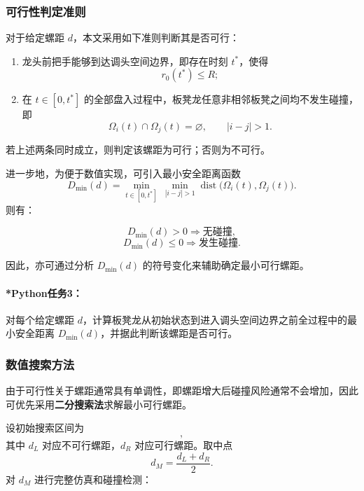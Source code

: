 \documentclass[12pt,a4paper]{ctexart}
\begin{document}
\subsubsection{可行性判定准则}
对于给定螺距 $d$，本文采用如下准则判断其是否可行：

\begin{enumerate}
    \item 龙头前把手能够到达调头空间边界，即存在时刻 $t^\ast$，使得
    \begin{equation}
    r_0(t^\ast)\le R;
    \end{equation}
    \item 在 $t\in[0,t^\ast]$ 的全部盘入过程中，板凳龙任意非相邻板凳之间均不发生碰撞，即
    \begin{equation}
    \Omega_i(t)\cap\Omega_j(t)=\varnothing,\qquad |i-j|>1.
    \end{equation}
\end{enumerate}

若上述两条同时成立，则判定该螺距为可行；否则为不可行。

进一步地，为便于数值实现，可引入最小安全距离函数
\begin{equation}
D_{\min}(d)=\min_{t\in[0,t^\ast]}\ \min_{|i-j|>1}\operatorname{dist}\bigl(\Omega_i(t),\Omega_j(t)\bigr).
\end{equation}
则有：

\begin{equation}
D_{\min}(d)>0 \Rightarrow \text{无碰撞},
\end{equation}
\begin{equation}
D_{\min}(d)\le 0 \Rightarrow \text{发生碰撞}.
\end{equation}

因此，亦可通过分析 $D_{\min}(d)$ 的符号变化来辅助确定最小可行螺距。

\paragraph{*Python任务3：}
对每个给定螺距 $d$，计算板凳龙从初始状态到进入调头空间边界之前全过程中的最小安全距离 $D_{\min}(d)$，并据此判断该螺距是否可行。

\subsubsection{数值搜索方法}
由于可行性关于螺距通常具有单调性，即螺距增大后碰撞风险通常不会增加，因此可优先采用\textbf{二分搜索法}求解最小可行螺距。

设初始搜索区间为
\begin{equation}
[d_L,d_R],
\end{equation}
其中 $d_L$ 对应不可行螺距，$d_R$ 对应可行螺距。取中点
\begin{equation}
d_M=\frac{d_L+d_R}{2}.
\end{equation}
对 $d_M$ 进行完整仿真和碰撞检测：
\end{document}
